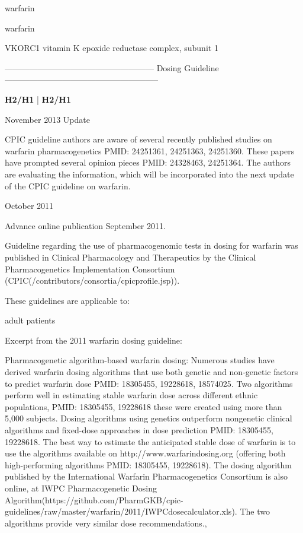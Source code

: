 \documentclass{resume} %
\begin{document}
\begin{rSection}{ warfarin }
\end{rSection}\begin{rSection}{ warfarin }
\item[]
\begin{rSubsection}{ VKORC1 }{ vitamin K epoxide reductase complex, subunit 1 }{}{}
\item[]
\item[] ------------------------------------------------------ Dosing Guideline --------------------------------------------------------\newline
\item[]
\item[] \textbf{ H2/H1 } | \textbf{ H2/H1 }
\item November 2013 Update
 \newline
\item CPIC guideline authors are aware of several recently published studies on warfarin pharmacogenetics PMID: 24251361, 24251363, 24251360. These papers have prompted several opinion pieces PMID: 24328463, 24251364. The authors are evaluating the information, which will be incorporated into the next update of the CPIC guideline on warfarin.
 \newline
\item October 2011
 \newline
\item Advance online publication September 2011. 
 \newline
\item Guideline regarding the use of pharmacogenomic tests in dosing for warfarin was published in Clinical Pharmacology and Therapeutics by the Clinical Pharmacogenetics Implementation Consortium (CPIC(/contributors/consortia/cpicprofile.jsp)).  
 \newline
\item These guidelines are applicable to:
 \newline
\item adult patients
 \newline
\item Excerpt from the 2011 warfarin dosing guideline:
 \newline
\item Pharmacogenetic algorithm-based warfarin dosing: Numerous studies have derived warfarin dosing algorithms that use both genetic and non-genetic factors to predict warfarin dose PMID: 18305455, 19228618, 18574025. Two algorithms perform well in estimating stable warfarin dose across different ethnic populations,  PMID: 18305455, 19228618 these were created using more than 5,000 subjects. Dosing algorithms using genetics outperform nongenetic clinical algorithms and fixed-dose approaches in dose prediction PMID: 18305455, 19228618. The best way to estimate the anticipated stable dose of warfarin is to use the algorithms available on http://www.warfarindosing.org (offering both high-performing algorithms PMID: 18305455, 19228618). The dosing algorithm published by the International Warfarin Pharmacogenetics Consortium is also online, at IWPC Pharmacogenetic Dosing Algorithm(https://github.com/PharmGKB/cpic-guidelines/raw/master/warfarin/2011/IWPCdosecalculator.xls). The two algorithms provide very similar dose recommendations., 

\end{rSubsection}
\end{rSection}
\end{document}
